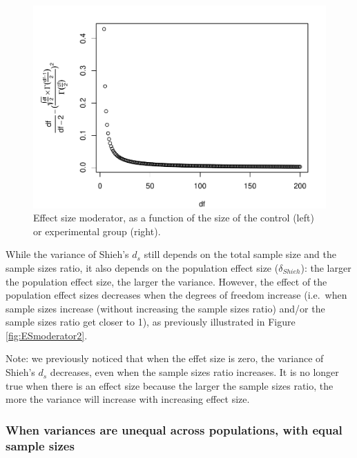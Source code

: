 \documentclass[
  man]{apa6}
\begin{document}
\begin{figure}
\centering
\includegraphics{Theoretical-Variance-of-all-estimators-as-a-function-of-population-parameters_files/figure-latex/ESmoderatorCohendprimeNsize2-1.pdf}
\caption{\label{fig:ESmoderatorCohendprimeNsize2}Effect size moderator, as a function of the size of the control (left) or experimental group (right).}
\end{figure}

While the variance of Shieh's \(d_s\) still depends on the total sample size and the sample sizes ratio, it also depends on the population effect size (\(\delta_{Shieh}\)): the larger the population effect size, the larger the variance. However, the effect of the population effect sizes decreases when the degrees of freedom increase (i.e.~when sample sizes increase (without increasing the sample sizes ratio) and/or the sample sizes ratio get closer to 1), as previously illustrated in Figure \ref{fig:ESmoderator2}.

Note: we previously noticed that when the effet size is zero, the variance of Shieh's \(d_s\) decreases, even when the sample sizes ratio increases. It is no longer true when there is an effect size because the larger the sample sizes ratio, the more the variance will increase with increasing effect size.

\hypertarget{when-variances-are-unequal-across-populations-with-equal-sample-sizes-2}{%
\subsubsection{When variances are unequal across populations, with equal sample sizes}\label{when-variances-are-unequal-across-populations-with-equal-sample-sizes-2}}
\end{document}
